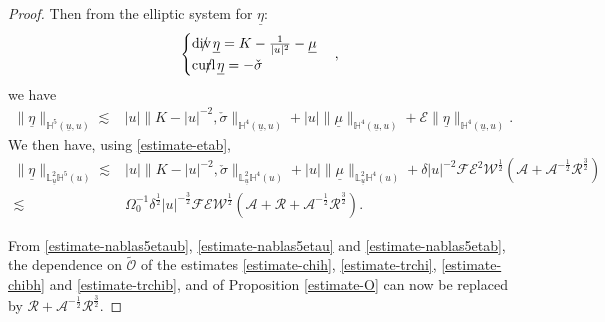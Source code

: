 \documentclass[11pt,reqno]{amsart}
\theoremstyle{definition}
\numberwithin{equation}{section}
\renewcommand{\L}{\mathbb{L}}
\renewcommand{\H}{\mathbb{H}}
\def\etab{\underline{\eta}}
\def\mub{\underline{\mu}}
\def\ub{\underline{u}}
\def\divs{\mbox{$\mathrm{div} \mkern -13mu /$ }}
\def\curls{\mbox{$\mathrm{curl} \mkern -13mu /$ }}
\begin{document}
\begin{proof}
Then from the elliptic system for $\etab$:
\begin{equation}\label{equ-ellipticetab}
\begin{cases}\divs\etab=K-\frac{1}{|u|^2}-\mub\\
\curls\etab=-\check{\sigma}\end{cases},
\end{equation}
we have
\begin{align*}
\|\etab\|_{\H^5(\ub,u)}\lesssim&|u|\|K-|u|^{-2},\check{\sigma}\|_{\H^4(\ub,u)}+|u|\|\mub\|_{\H^4(\ub,u)}+\mathscr{E}\|\etab\|_{\H^4(\ub,u)}.
\end{align*}
We then have, using \eqref{estimate-etab}, \begin{equation}\label{estimate-nablas5etab}
\begin{split}
\|\etab\|_{\L^2_{\ub}\H^5(u)}\lesssim&|u|\|K-|u|^{-2},\check{\sigma}\|_{\L^2_{\ub}\H^4(u)}+|u|\|\mub\|_{\L^2_{\ub}\H^4(u)}+\delta|u|^{-2}\mathscr{F}\mathscr{E}^2\mathscr{W}^{\frac{1}{2}}(\mathcal{A}+\mathcal{A}^{-\frac{1}{2}}\mathcal{R}^{\frac{3}{2}})\\
\lesssim&\Omega_0^{-1}\delta^{\frac{1}{2}}|u|^{-\frac{3}{2}}\mathscr{F}\mathscr{E}\mathscr{W}^{\frac{1}{2}}(\mathcal{A}+\mathcal{R}+\mathcal{A}^{-\frac{1}{2}}\mathcal{R}^{\frac{3}{2}}).
\end{split}
\end{equation}

From \eqref{estimate-nablas5etaub}, \eqref{estimate-nablas5etau} and \eqref{estimate-nablas5etab}, the dependence on $\widetilde{\mathcal{O}}$ of the estimates \eqref{estimate-chih}, \eqref{estimate-trchi}, \eqref{estimate-chibh} and \eqref{estimate-trchib}, and of Proposition \ref{estimate-O} can now be replaced by $\mathcal{R}+\mathcal{A}^{-\frac{1}{2}}\mathcal{R}^{\frac{3}{2}}$.



\end{proof}
\end{document}
